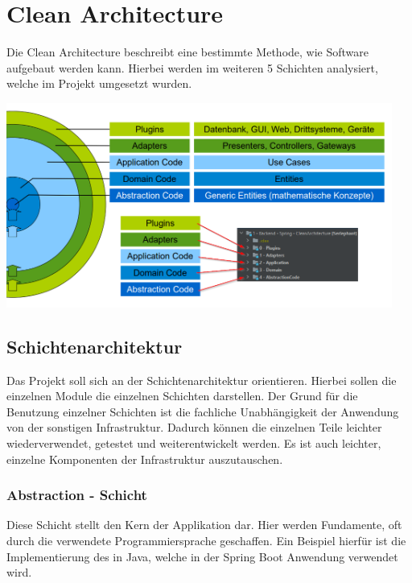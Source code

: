 
\chapter{Clean Architecture}
\label{cleanArchitecture}
    Die Clean Architecture beschreibt eine bestimmte Methode, wie Software aufgebaut werden kann. Hierbei werden im weiteren 5 Schichten analysiert, welche im Projekt umgesetzt wurden.
    
    \includegraphics[width=0.95\textwidth]{zfiles/Bilder/schichten.png}

    \section{Schichtenarchitektur}
     Das Projekt soll sich an der Schichtenarchitektur orientieren. Hierbei sollen die einzelnen Module die einzelnen Schichten darstellen. Der Grund für die Benutzung einzelner Schichten ist die fachliche Unabhängigkeit der Anwendung von der sonstigen Infrastruktur. Dadurch können die einzelnen Teile leichter wiederverwendet, getestet und weiterentwickelt werden. Es ist auch leichter, einzelne Komponenten der Infrastruktur auszutauschen.
    
        \subsection{Abstraction - Schicht}
    	Diese Schicht stellt den Kern der Applikation dar. Hier werden Fundamente, oft durch die verwendete Programmiersprache geschaffen. Ein Beispiel hierfür ist die Implementierung des  in Java, welche in der Spring Boot Anwendung verwendet wird.
